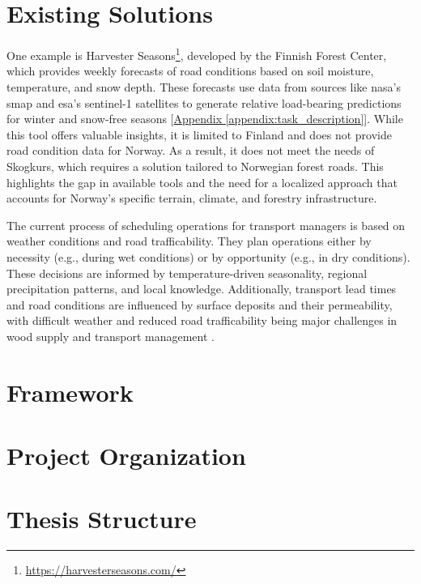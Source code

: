 \section{Existing Solutions}

One example is Harvester Seasons\footnote{\url{https://harvesterseasons.com/}}, developed by the Finnish Forest Center, which provides weekly forecasts of road conditions based on soil moisture, temperature, and snow depth. These forecasts use data from sources like \acrshort{nasa}'s \gls{smap} and \acrshort{esa}'s \Gls{sentinel-1} satellites to generate relative load-bearing predictions for winter and snow-free seasons [\hyperref[appendix:task_description]{Appendix \ref*{appendix:task_description}}]. While this tool offers valuable insights, it is limited to Finland and does not provide road condition data for Norway. As a result, it does not meet the needs of Skogkurs, which requires a solution tailored to Norwegian forest roads. This highlights the gap in available tools and the need for a localized approach that accounts for Norway’s specific terrain, climate, and forestry infrastructure.

The current process of scheduling operations for transport managers is based on weather conditions and road \gls{trafficability}. They plan operations either by necessity (e.g., during wet conditions) or by opportunity (e.g., in dry conditions). These decisions are informed by temperature-driven seasonality, regional precipitation patterns, and local knowledge. Additionally, transport lead times and road conditions are influenced by surface deposits and their \gls{permeability}, with difficult weather and reduced road \gls{trafficability} being major challenges in wood supply and transport management \cite{fjeld2023trafficability}. 

\section{Framework}

\section{Project Organization}

\section{Thesis Structure}

